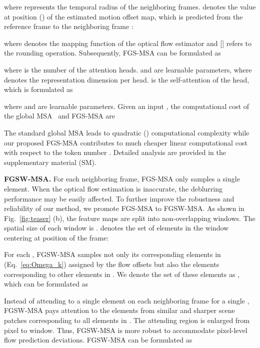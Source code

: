 \documentclass{article}
\begin{document}
	where  represents the temporal radius of the neighboring frames.  denotes the value at position () of the estimated motion offset map, which is predicted from the reference frame  to the neighboring frame :
	
	where  denotes the mapping function of the optical flow estimator and [] refers to the rounding operation. Subsequently, FGS-MSA can be formulated as
	\vspace{-0.5mm}
	
	where  is the number of the attention heads.  and  are learnable parameters, where  denotes the representation dimension per head.   is the self-attention of the  head, which is formulated as
	\vspace{-0.5mm}
	
	where  and  are learnable parameters. Given an input , the computational cost of the global MSA~\cite{global_msa} and FGS-MSA are
	\vspace{-1mm}
	
The standard global MSA leads to quadratic () computational complexity while our proposed FGS-MSA contributes to much cheaper linear computational cost with respect to the token number . Detailed analysis are provided in the supplementary material (SM).
	


	\noindent\textbf{FGSW-MSA.} For each neighboring frame, FGS-MSA only samples a single  element. When the optical flow estimation is inaccurate, the deblurring performance may be easily affected. To further improve the robustness and reliability of our method, we promote FGS-MSA to FGSW-MSA. As shown in Fig.~\ref{fig:teaser} (b), the feature maps are split into non-overlapping windows. The spatial size of each window is .  denotes the set of  elements in the window centering at position  of the  frame:
	\vspace{-1mm}
	 
	For each , FGSW-MSA samples not only its corresponding  elements in  (Eq.~\eqref{eq:Omega_k}) assigned by the flow offsets but also the  elements corresponding to other  elements in . We denote the set of these  elements as , which can be formulated as
	\vspace{-1mm}
	
	Instead of attending to a single  element on each neighboring frame for a single , FGSW-MSA pays attention to the  elements from similar and sharper scene patches corresponding to all  elements in . The attending region is enlarged from pixel to window. Thus, FGSW-MSA is more robust to accommodate pixel-level flow prediction deviations. FGSW-MSA can be formulated as
	\vspace{-0.5mm}
	
\end{document}
